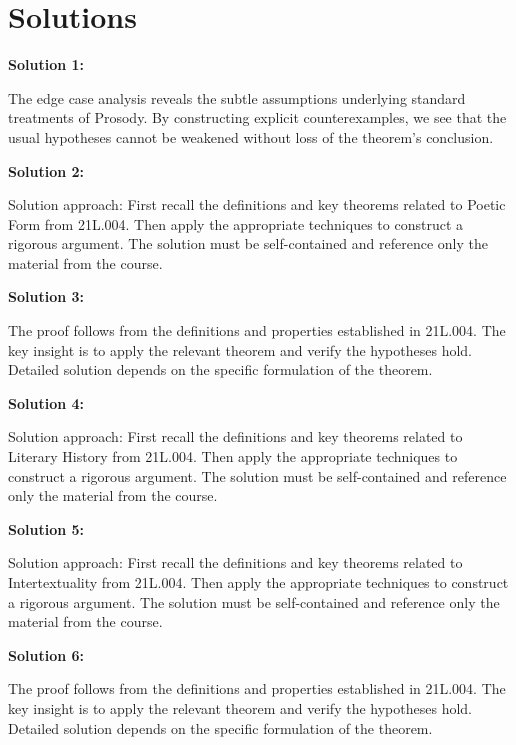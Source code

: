 \documentclass[12pt,a4paper]{exam}
\begin{document}
\newpage
\section*{Solutions}

\textbf{Solution 1:}

The edge case analysis reveals the subtle assumptions underlying standard treatments of Prosody. By constructing explicit counterexamples, we see that the usual hypotheses cannot be weakened without loss of the theorem's conclusion.

\vspace{0.5cm}

\textbf{Solution 2:}

Solution approach: First recall the definitions and key theorems related to Poetic Form from 21L.004. Then apply the appropriate techniques to construct a rigorous argument. The solution must be self-contained and reference only the material from the course.

\vspace{0.5cm}

\textbf{Solution 3:}

The proof follows from the definitions and properties established in 21L.004. The key insight is to apply the relevant theorem and verify the hypotheses hold. Detailed solution depends on the specific formulation of the theorem.

\vspace{0.5cm}

\textbf{Solution 4:}

Solution approach: First recall the definitions and key theorems related to Literary History from 21L.004. Then apply the appropriate techniques to construct a rigorous argument. The solution must be self-contained and reference only the material from the course.

\vspace{0.5cm}

\textbf{Solution 5:}

Solution approach: First recall the definitions and key theorems related to Intertextuality from 21L.004. Then apply the appropriate techniques to construct a rigorous argument. The solution must be self-contained and reference only the material from the course.

\vspace{0.5cm}

\textbf{Solution 6:}

The proof follows from the definitions and properties established in 21L.004. The key insight is to apply the relevant theorem and verify the hypotheses hold. Detailed solution depends on the specific formulation of the theorem.
\end{document}
